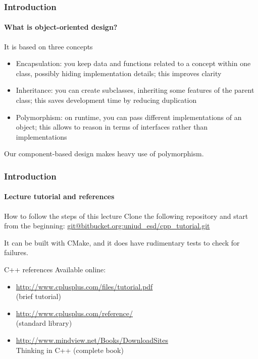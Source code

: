 \begin{frame}
\frametitle{Introduction}
\framesubtitle{What is object-oriented design?}

\begin{block}{It is based on three concepts}
\begin{itemize}
\item Encapsulation: you keep data and functions related to a concept within one class, possibly hiding implementation details; this improves clarity
\item Inheritance: you can create subclasses, inheriting some features of the parent class; this saves development time by reducing duplication
\item Polymorphism: on runtime, you can pass different implementations of an object; this allows to reason in terms of interfaces rather than implementations
\end{itemize}
Our component-based design makes heavy use of polymorphism.
\end{block}

\end{frame}

\begin{frame}
\frametitle{Introduction}
\framesubtitle{Lecture tutorial and references}

\begin{block}{How to follow the steps of this lecture}
Clone the following repository and start from the beginning:
\url{git@bitbucket.org:uniud_esd/cpp_tutorial.git}

\medskip 
\pause
It can be built with CMake, and it does have rudimentary tests to check for failures.
\end{block}
\pause
\begin{block}{C++ references}
Available online:
\begin{itemize}
\item \url{http://www.cplusplus.com/files/tutorial.pdf} \\ (brief tutorial)
\item \url{http://www.cplusplus.com/reference/} \\ (standard library)
\item \url{http://www.mindview.net/Books/DownloadSites} \\ Thinking in C++ (complete book)
\end{itemize}
\end{block}

\end{frame}

